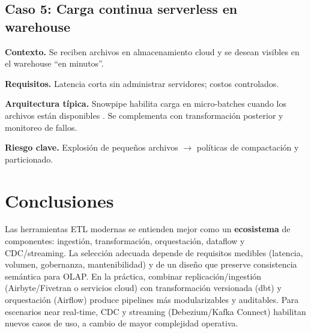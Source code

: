 \documentclass[12pt]{article}
\begin{document}
\subsection{Caso 5: Carga continua serverless en warehouse}
\textbf{Contexto.} Se reciben archivos en almacenamiento cloud y se desean visibles en el warehouse “en minutos”.

\textbf{Requisitos.} Latencia corta sin administrar servidores; costos controlados.

\textbf{Arquitectura típica.} Snowpipe habilita carga en micro-batches cuando los archivos están disponibles \cite{snowpipe_intro}. Se complementa con transformación posterior y monitoreo de fallos.

\textbf{Riesgo clave.} Explosión de pequeños archivos $\rightarrow$ políticas de compactación y particionado.

\section{Conclusiones}
Las herramientas ETL modernas se entienden mejor como un \textbf{ecosistema} de componentes: ingestión, transformación, orquestación, dataflow y CDC/streaming. La selección adecuada depende de requisitos medibles (latencia, volumen, gobernanza, mantenibilidad) y de un diseño que preserve consistencia semántica para OLAP. En la práctica, combinar replicación/ingestión (Airbyte/Fivetran o servicios cloud) \cite{airbyte_docs,fivetran_getting_started,ms_adf_intro,aws_glue_what,gcp_data_fusion_overview} con transformación versionada (dbt) \cite{dbt_intro} y orquestación (Airflow) \cite{airflow_what_is} produce pipelines más modularizables y auditables. Para escenarios near real-time, CDC y streaming (Debezium/Kafka Connect) \cite{debezium_home,kafka_connect_user_guide} habilitan nuevos casos de uso, a cambio de mayor complejidad operativa.

\clearpage
\printbibliography
\end{document}
